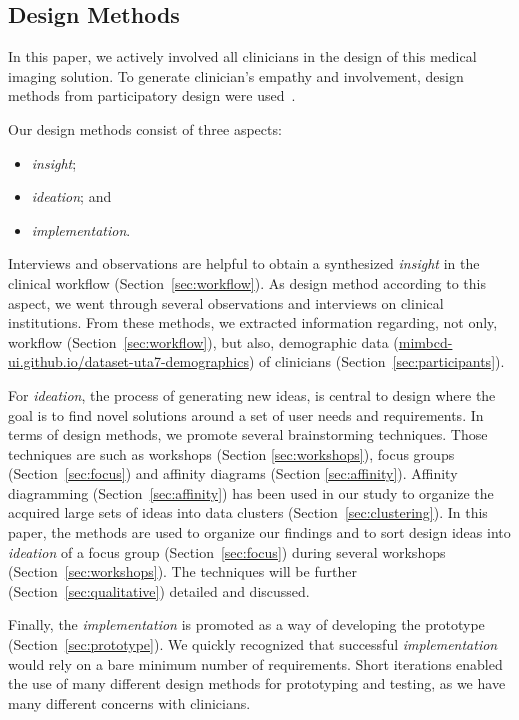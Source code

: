 \subsection{Design Methods}

In this paper, we actively involved all clinicians in the design of this medical imaging solution.
To generate clinician's empathy and involvement, design methods from participatory design were used~\cite{10.1145/3025453.3025873}.

\hfill

\noindent
Our design methods consist of three aspects:

\hfill

\begin{itemize}
\item {\it insight};
\item {\it ideation}; and
\item {\it implementation}.
\end{itemize}

\hfill

Interviews and observations are helpful to obtain a synthesized {\it insight} in the clinical workflow (Section~\ref{sec:workflow}).
As design method according to this aspect, we went through several observations and interviews on clinical institutions.
From these methods, we extracted information regarding, not only, workflow (Section~\ref{sec:workflow}), but also, demographic data (\href{https://mimbcd-ui.github.io/dataset-uta7-demographics}{mimbcd-ui.github.io/dataset-uta7-demographics}) of clinicians (Section~\ref{sec:participants}).

For {\it ideation}, the process of generating new ideas, is central to design where the goal is to find novel solutions around a set of user needs and requirements.
In terms of design methods, we promote several brainstorming techniques.
Those techniques are such as workshops (Section \ref{sec:workshops}), focus groups (Section~\ref{sec:focus}) and affinity diagrams (Section \ref{sec:affinity}).
Affinity diagramming (Section~\ref{sec:affinity}) has been used in our study to organize the acquired large sets of ideas into data clusters (Section~\ref{sec:clustering}).
In this paper, the methods are used to organize our findings and to sort design ideas into {\it ideation} of a focus group (Section~\ref{sec:focus}) during several workshops (Section~\ref{sec:workshops}).
The techniques will be further (Section~\ref{sec:qualitative}) detailed and discussed.

Finally, the {\it implementation} is promoted as a way of developing the prototype (Section~\ref{sec:prototype}).
We quickly recognized that successful {\it implementation} would rely on a bare minimum number of requirements.
Short iterations enabled the use of many different design methods for prototyping and testing, as we have many different concerns with clinicians.